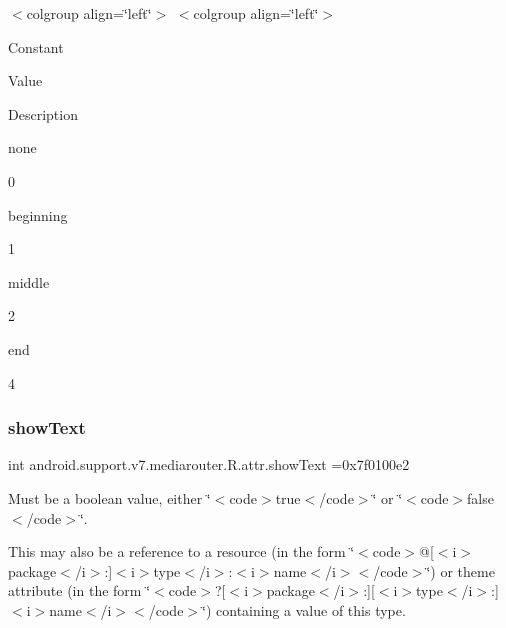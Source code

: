 \tabulinesep=1mm
\begin{longtabu} spread 0pt [c]{*{0}{|X[-1]}|}
\hline
\end{longtabu}
$<$colgroup align=\char`\"{}left\char`\"{}$>$ $<$colgroup align=\char`\"{}left\char`\"{}$>$ 

Constant

Value

Description 

{\ttfamily none}

0

{\ttfamily beginning}

1

{\ttfamily middle}

2

{\ttfamily end}

4\mbox{\label{classandroid_1_1support_1_1v7_1_1mediarouter_1_1R_1_1attr_a26211d9eb735cfec1338b7c826645ce7}} 
\subsubsection{\texorpdfstring{show\+Text}{showText}}
{\footnotesize\ttfamily int android.\+support.\+v7.\+mediarouter.\+R.\+attr.\+show\+Text =0x7f0100e2\hspace{0.3cm}{\ttfamily [static]}}

Must be a boolean value, either \char`\"{}$<$code$>$true$<$/code$>$\char`\"{} or \char`\"{}$<$code$>$false$<$/code$>$\char`\"{}. 

This may also be a reference to a resource (in the form \char`\"{}$<$code$>$@\mbox{[}$<$i$>$package$<$/i$>$\+:\mbox{]}$<$i$>$type$<$/i$>$\+:$<$i$>$name$<$/i$>$$<$/code$>$\char`\"{}) or theme attribute (in the form \char`\"{}$<$code$>$?\mbox{[}$<$i$>$package$<$/i$>$\+:\mbox{]}\mbox{[}$<$i$>$type$<$/i$>$\+:\mbox{]}$<$i$>$name$<$/i$>$$<$/code$>$\char`\"{}) containing a value of this type. \mbox{\label{classandroid_1_1support_1_1v7_1_1mediarouter_1_1R_1_1attr_aec1486090b6c1e8a66f14d79efdb2b40}} 

